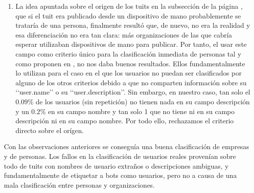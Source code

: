 \begin{enumerate}
\item La idea apuntada sobre el origen de los tuits en la subsección  de la
página \pageref{subsubsect:origen_tuits}, que si el tuit era publicado desde un dispositivo de mano 
probablemente se trataría de una persona,  finalmente resultó que, de nuevo, no era la realidad y esa
diferenciación no era tan clara: más organizaciones de las que cabría esperar utilizaban dispositivos
de mano para publicar. Por tanto, el usar este campo como criterio único para la clasificación 
inmediata de personas tal y como proponen en \cite{user_class}, no nos daba buenos resultados. 
Ellos fundamentalmente lo utilizan para el caso en el que los usuarios no puedan ser clasificados
por alguno de los otros criterios debido a que no comparten información sobre su \lq\lq user.name\rq\rq 
o su \lq\lq user.description\rq\rq. Sin embargo, en nuestro caso, tan solo el $0.09$\% de los 
usuarios (sin repetición) no tienen nada en su campo descripción y un $0.2$\% en su campo nombre y tan solo 1 que no tiene ni en su campo descripción ni en su campo nombre. Por todo ello, rechazamos el criterio directo sobre el  orígen.
\end{enumerate}

Con las observaciones anteriores se conseguía una buena clasificación de empresas y de personas. 
Los fallos en la clasificación de usuarios reales provenían sobre todo de tuits con nombres 
de usuario extraños o descripciones ambiguas, y fundamentalmente de etiquetar a bots como usuarios,  
pero no a causa de una mala clasificación entre personas y organizaciones.


